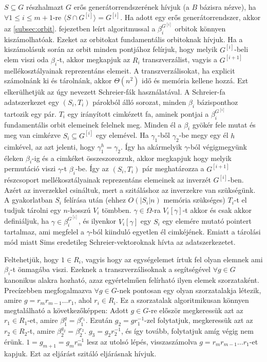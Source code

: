 $S \subseteq G$ részhalmazt $G$ erős generátorrendszerének hívjuk (a $B$ bázisra nézve), ha $\forall 1\le i \le m+1$-re $\langle S \cap G^{[i]} \rangle = G^{[i]}$.
Ha adott egy erős generátorrendszer, akkor az \ref{subsec:orbit}. fejezetben leírt algoritmussal a $\beta_i^{G^{[i]}}$ orbitok könnyen kiszámolhatóak.
Ezeket az orbitokat fundamentális orbitoknak hívjuk.
Ha a kiszámolásuk során az orbit minden pontjához felírjuk, hogy melyik $G^{[i]}$-beli elem viszi oda $\beta_i$-t, akkor megkapjuk az $R_i$ transzverzálist,
vagyis a $G^{[i+1]}$ mellékosztályainak reprezentáns elemeit.
A transzverzálisokat, ha explicit számolnánk ki és tárolnánk, akkor $\Theta(n^2)$ idő és memória kellene hozzá.
Ezt elkerülhetjük az úgy nevezett Schreier-fák használatával.
A Schreier-fa adatszerkezet egy $(S_i, T_i)$ párokból álló sorozat, minden $\beta_i$ bázisponthoz tartozik egy pár.
$T_i$ egy irányított cimkézett fa, aminek pontjai a $\beta_i^{G^{[i]}}$ fundamentális orbit elemeinek felelnek meg.
Minden él a $\beta_i$ gyökér fele mutat és meg van cimkézve $S_i \subseteq G^{[i]}$ egy elemével.
Ha $\gamma_1$-ből $\gamma_2$-be megy egy él $h$ cimkével, az azt jelenti, hogy $\gamma_1^h=\gamma_2$.
Így ha akármelyik $\gamma$-ból végigmegyünk éleken $\beta_i$-ig és a cimkéket összeszorozzuk, akkor megkapjuk hogy melyik
permutáció viszi $\gamma$-t $\beta_i$-be. Így az $(S_i, T_i)$ pár meghatározza a $G^{[i+1]}$ részcsoport mellékosztályainak 
reprezentáns elemeinek az inverzét $G^{[i]}$-ben. Azért az inverzekkel csináltuk, mert a szitáláshoz az inverzekre van szükségünk.
A gyakorlatban $S_i$ felírása után (ehhez $O(|S_i|n)$ memória szükséges) $T_i$-t el tudjuk tárolni egy $n$-hosszú $V_i$ tömbben.
$\gamma \in \Omega$-ra $V_i[\gamma]$-t akkor és csak akkor definiáljuk, ha $\gamma \in \beta_i^{G^{[i]}}$,
és ilyenkor $V_i[\gamma]$ egy $S_i$ egy elemére mutató pointert tartalmaz, ami megfelel a $\gamma$-ból kiinduló egyetlen él cimkéjének.
Emiatt a tárolási mód miatt Sims eredetileg Schreier-vektoroknak hívta az adatszerkezetet.

Feltehetjük, hogy $1 \in R_i$, vagyis hogy az egységelemet írtuk fel olyan elemnek ami $\beta_i$-t önmagába viszi.
Ezeknek a transzverzálisoknak a segítségével $\forall g \in G$ kanonikus alakra hozható, azaz egyértelműen felírható ilyen elemek szorzataként.
Precízebben megfogalmazva $\forall g \in G$-nek pontosan egy olyan szorzatalakja létezik, amire $g = r_m r_{m-1} \dots r_1$, ahol $r_i \in R_i$.
Ez a szorzatalak algoritmikusan könnyen megtalálható a következőképpen: Adott $g \in G$-re először megkeressük azt az $r_1 \in R_1$-et, amire $\beta_1^g = \beta_1^{r_1}$.
Ezután $g_2 = g r_1^{-1}$-zel folytatjuk, megkeressük azt az $r_2 \in R_2$-t, amire $\beta_2^{g_2} = \beta_2^{r_2}$. $g_3 = g_2 r_2^{-1}$, és így tovább, folytatjuk amíg végig nem érünk.
$1 = g_{m+1} = g_{m} r_m^{-1}$ lesz az utolsó lépés, visszaszámolva $g = r_m r_{m-1} \dots r_1$-et kapjuk. Ezt az eljárást szitáló eljárásnak hívjuk.

